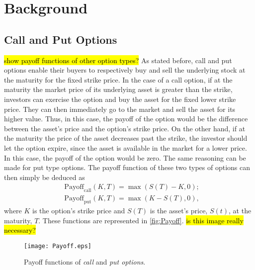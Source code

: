 \chapter{Background}
\label{chapter:background}
\section{Call and Put Options}
\hl{show payoff functions of other option types?}
As stated before, call and put options enable their buyers to respectively buy and sell the underlying stock at the maturity for the fixed strike price.
In the case of a call option, if at the maturity the market price of its underlying asset is greater than the strike, investors can exercise the option and buy the asset for the fixed lower strike price. They can then immediately go to the market and sell the asset for its higher value. Thus, in this case, the payoff of the option would be the difference between the asset's price and the option's strike price. On the other hand, if at the maturity the price of the asset decreases past the strike, the investor should let the option expire, since the asset is available in the market for a lower price. In this case, the payoff of the option would be zero.
The same reasoning can be made for put type options.
The payoff function of these two types of options can then simply be deduced as
\begin{equation}\label{callput}
\begin{split}
&\text{Payoff}_\text{call}(K,T)=\max\left(S(T)-K,0\right);\\
&\text{Payoff}_\text{put}(K,T)=\max\left(K-S(T),0\right),
\end{split}
\end{equation}
\noindent where $K$ is the option's strike price and $S(T)$ is the asset's price, $S(t)$, at the maturity, $T$. These functions are represented in \autoref{fig:Payoff}. \hl{is this image really necessary?}

\begin{figure}[!htb]
    \centering
      \texttt{[image: Payoff.eps]}
      \caption[Payoff functions of call and put options]{Payoff functions of \emph{call} and \emph{put options}.}\label{fig:Payoff}
    \end{figure}
    

